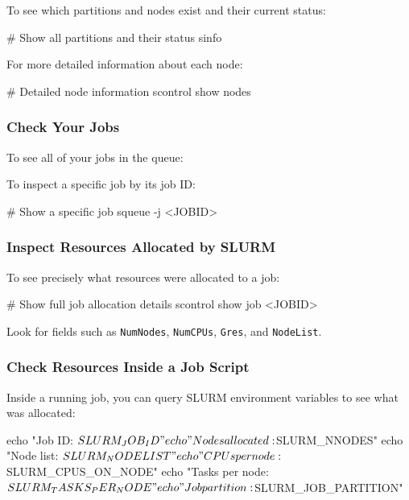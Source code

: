 \documentclass[11pt]{article}
\begin{document}
To see which partitions and nodes exist and their current status:

\begin{codeblock}
# Show all partitions and their status
sinfo
\end{codeblock}

For more detailed information about each node:

\begin{codeblock}
# Detailed node information
scontrol show nodes
\end{codeblock}

\subsubsection{Check Your Jobs}

To see all of your jobs in the queue:


To inspect a specific job by its job ID:

\begin{codeblock}
# Show a specific job
squeue -j <JOBID>
\end{codeblock}

\subsubsection{Inspect Resources Allocated by SLURM}

To see precisely what resources were allocated to a job:

\begin{codeblock}
# Show full job allocation details
scontrol show job <JOBID>
\end{codeblock}

Look for fields such as \texttt{NumNodes}, \texttt{NumCPUs}, \texttt{Gres},
and \texttt{NodeList}.

\subsubsection{Check Resources Inside a Job Script}

Inside a running job, you can query SLURM environment variables
to see what was allocated:

\begin{codeblock}
echo "Job ID:            $SLURM_JOB_ID"
echo "Nodes allocated:   $SLURM_NNODES"
echo "Node list:         $SLURM_NODELIST"
echo "CPUs per node:     $SLURM_CPUS_ON_NODE"
echo "Tasks per node:    $SLURM_TASKS_PER_NODE"
echo "Job partition:     $SLURM_JOB_PARTITION"
\end{codeblock}
\end{document}
